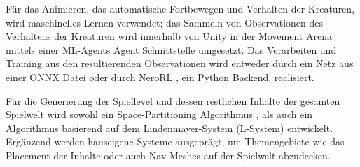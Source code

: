 Für das Animieren, das automatische Fortbewegen und Verhalten der Kreaturen, wird maschinelles Lernen verwendet; das Sammeln von Observationen des Verhaltens der Kreaturen wird innerhalb von Unity in der Movement Arena mittels einer ML-Agents Agent \cite{mlAgents} Schnittstelle umgesetzt. Das Verarbeiten und Training aus den resultierenden Observationen wird entweder durch ein Netz aus einer ONNX Datei oder durch NeroRL \cite{neroRL}, ein Python Backend, realisiert.

Für die Generierung der Spiellevel und dessen restlichen Inhalte der gesamten Spielwelt wird sowohl ein Space-Partitioning Algorithmus \cite{Shaker2016}, als auch ein Algorithmus basierend auf dem Lindenmayer-System (L-System) \cite{lindenmayer1990} entwickelt. Ergänzend werden hauseigene Systeme ausgeprägt, um Themengebiete wie das Placement der Inhalte oder auch Nav-Meshes auf der Spielwelt abzudecken.

